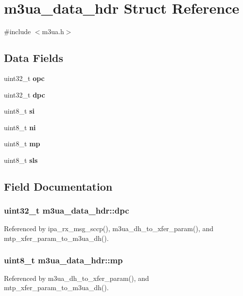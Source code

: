 \section{m3ua\+\_\+data\+\_\+hdr Struct Reference}
\label{structm3ua__data__hdr}


{\ttfamily \#include $<$m3ua.\+h$>$}

\subsection*{Data Fields}
\begin{DoxyCompactItemize}
\item 
uint32\+\_\+t {\bf opc}
\item 
uint32\+\_\+t {\bf dpc}
\item 
uint8\+\_\+t {\bf si}
\item 
uint8\+\_\+t {\bf ni}
\item 
uint8\+\_\+t {\bf mp}
\item 
uint8\+\_\+t {\bf sls}
\end{DoxyCompactItemize}


\subsection{Field Documentation}
\subsubsection[{dpc}]{\setlength{\rightskip}{0pt plus 5cm}uint32\+\_\+t m3ua\+\_\+data\+\_\+hdr\+::dpc}\label{structm3ua__data__hdr_a4a4ac12a471df8bd0fe10ec2f0682af5}


Referenced by ipa\+\_\+rx\+\_\+msg\+\_\+sccp(), m3ua\+\_\+dh\+\_\+to\+\_\+xfer\+\_\+param(), and mtp\+\_\+xfer\+\_\+param\+\_\+to\+\_\+m3ua\+\_\+dh().

\subsubsection[{mp}]{\setlength{\rightskip}{0pt plus 5cm}uint8\+\_\+t m3ua\+\_\+data\+\_\+hdr\+::mp}\label{structm3ua__data__hdr_a688c80327990370fd86331a1140ec75e}


Referenced by m3ua\+\_\+dh\+\_\+to\+\_\+xfer\+\_\+param(), and mtp\+\_\+xfer\+\_\+param\+\_\+to\+\_\+m3ua\+\_\+dh().

